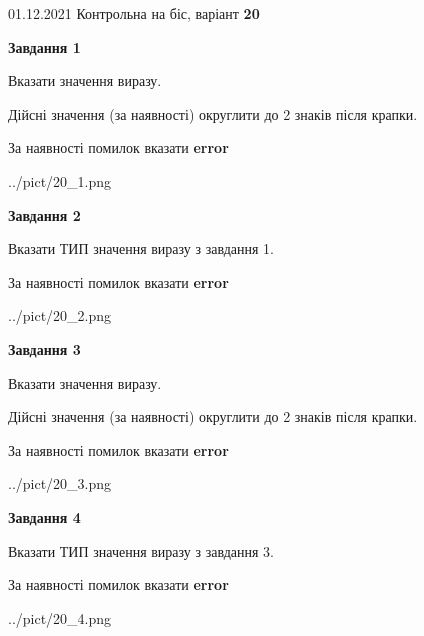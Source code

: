 \documentclass[11pt, ukrainian]{article}
\begin{document}
{01.12.2021 Контрольна на біс, варіант  \No \textbf { 20 }\par}
{
\begin {large}
{\begin {center}\textbf{Завдання 1}\end {center}}\par
Вказати значення виразу. \par
Дійсні значення (за наявності) округлити до 2 знаків після крапки. \par
За наявності помилок вказати \textbf{error}

\begin{center}
	{../pict/20_1.png}
\end{center}
\newpage

{\begin {center}\textbf{Завдання 2}\end {center}}\par
Вказати ТИП значення виразу з завдання 1. \par
За наявності помилок вказати \textbf{error}

\begin{center}
	{../pict/20_2.png}
\end{center}
\newpage

{\begin {center}\textbf{Завдання 3}\end {center}}\par
Вказати значення виразу. \par
Дійсні значення (за наявності) округлити до 2 знаків після крапки. \par
За наявності помилок вказати \textbf{error}

\begin{center}
	{../pict/20_3.png}
\end{center}
\newpage

{\begin {center}\textbf{Завдання 4}\end {center}}\par
Вказати ТИП значення виразу з завдання 3. \par
За наявності помилок вказати \textbf{error}

\begin{center}
	{../pict/20_4.png}
\end{center}
\newpage


\end{large}}
\end{document}
